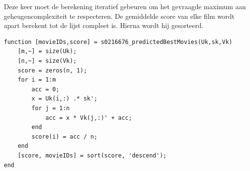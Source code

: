 Deze keer moet de berekening iteratief gebeuren om het gevraagde maximum aan geheugencomplexiteit te respecteren. De gemiddelde score van elke film wordt apart berekent tot de lijst compleet is. Hierna wordt hij gesorteerd.

\begin{lstlisting}
function [movieIDs,score] = s0216676_predictedBestMovies(Uk,sk,Vk)
    [m,~] = size(Uk); 
    [n,~] = size(Vk);
    score = zeros(n, 1);
    for i = 1:m
        acc = 0;
        x = Uk(i,:) .* sk';
        for j = 1:n
            acc = x * Vk(j,:)' + acc;
        end
        score(i) = acc / n;
    end
    [score, movieIDs] = sort(score, 'descend');
end
\end{lstlisting}


\thispagestyle{empty}

